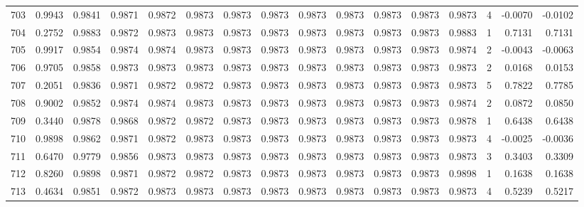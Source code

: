 \begin{tabular}{lrrrrrrrrrrrrrrr}
703 &      0.9943 &  0.9841 &  0.9871 &  0.9872 &  0.9873 &  0.9873 &  0.9873 &  0.9873 &  0.9873 &  0.9873 &   0.9873 &     0.9873 &      4 &                   -0.0070 &                    -0.0102 \\
704 &      0.2752 &  0.9883 &  0.9872 &  0.9873 &  0.9873 &  0.9873 &  0.9873 &  0.9873 &  0.9873 &  0.9873 &   0.9873 &     0.9883 &      1 &                    0.7131 &                     0.7131 \\
705 &      0.9917 &  0.9854 &  0.9874 &  0.9874 &  0.9873 &  0.9873 &  0.9873 &  0.9873 &  0.9873 &  0.9873 &   0.9873 &     0.9874 &      2 &                   -0.0043 &                    -0.0063 \\
706 &      0.9705 &  0.9858 &  0.9873 &  0.9873 &  0.9873 &  0.9873 &  0.9873 &  0.9873 &  0.9873 &  0.9873 &   0.9873 &     0.9873 &      2 &                    0.0168 &                     0.0153 \\
707 &      0.2051 &  0.9836 &  0.9871 &  0.9872 &  0.9872 &  0.9873 &  0.9873 &  0.9873 &  0.9873 &  0.9873 &   0.9873 &     0.9873 &      5 &                    0.7822 &                     0.7785 \\
708 &      0.9002 &  0.9852 &  0.9874 &  0.9874 &  0.9873 &  0.9873 &  0.9873 &  0.9873 &  0.9873 &  0.9873 &   0.9873 &     0.9874 &      2 &                    0.0872 &                     0.0850 \\
709 &      0.3440 &  0.9878 &  0.9868 &  0.9872 &  0.9872 &  0.9873 &  0.9873 &  0.9873 &  0.9873 &  0.9873 &   0.9873 &     0.9878 &      1 &                    0.6438 &                     0.6438 \\
710 &      0.9898 &  0.9862 &  0.9871 &  0.9872 &  0.9873 &  0.9873 &  0.9873 &  0.9873 &  0.9873 &  0.9873 &   0.9873 &     0.9873 &      4 &                   -0.0025 &                    -0.0036 \\
711 &      0.6470 &  0.9779 &  0.9856 &  0.9873 &  0.9873 &  0.9873 &  0.9873 &  0.9873 &  0.9873 &  0.9873 &   0.9873 &     0.9873 &      3 &                    0.3403 &                     0.3309 \\
712 &      0.8260 &  0.9898 &  0.9871 &  0.9872 &  0.9872 &  0.9873 &  0.9873 &  0.9873 &  0.9873 &  0.9873 &   0.9873 &     0.9898 &      1 &                    0.1638 &                     0.1638 \\
713 &      0.4634 &  0.9851 &  0.9872 &  0.9873 &  0.9873 &  0.9873 &  0.9873 &  0.9873 &  0.9873 &  0.9873 &   0.9873 &     0.9873 &      4 &                    0.5239 &                     0.5217 \\

\end{tabular}
